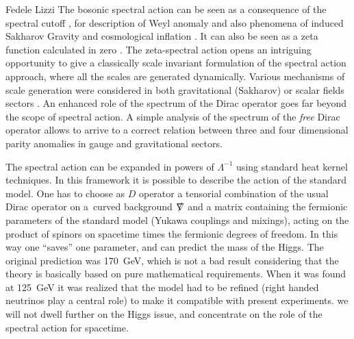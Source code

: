 \begin{artengenv}{Fedele Lizzi}
The bosonic spectral action can be seen as a consequence of the spectral cutoff \parencite{Andrianov:2010nr,Andrianov:2011bc,Kurkov:2012dn}, for description of Weyl anomaly and also phenomena of induced Sakharov Gravity \parencite{Sakharov} and cosmological inflation \parencite{Kurkov:2013gma}. It can also be seen as a zeta function calculated in zero \parencite{zeta}. The zeta-spectral action opens an intriguing opportunity to give a classically scale invariant formulation of the spectral action approach, where all the scales are generated dynamically.  Various mechanisms of scale generation were considered in both gravitational (Sakharov) or scalar fields sectors \parencite{ripples}. An enhanced role of the spectrum of the Dirac operator goes  far beyond the scope of spectral action. A simple analysis of the spectrum of the \emph{free} Dirac operator allows to arrive to a correct relation between three and four dimensional parity anomalies in gauge \parencite{Kurkov:2017cdz} and gravitational \parencite{Kurkov:2018pjw} sectors.





The spectral action can be expanded in powers of $\Lambda^{-1}$ using standard heat kernel techniques.
In this framework it is possible to describe the action of the standard model.
One has to choose as $D$ operator a tensorial combination of the usual Dirac operator on a~curved background  $\slashed\nabla$ and a matrix containing the fermionic parameters of the standard model (Yukawa couplings and mixings), acting on the product of spinors on spacetime times the fermionic degrees of freedom. In this way one ``saves'' one parameter, and can predict the mass of the Higgs. The original prediction was 170~GeV, which is not a bad result considering that the theory is basically based on pure mathematical requirements. When it was found at 125~GeV it was realized that the model had to be refined (right handed neutrinos play a central role) to make it compatible with present experiments. 
we will not dwell further on the Higgs issue, and concentrate on the role of the spectral action for spacetime.


\end{artengenv}
